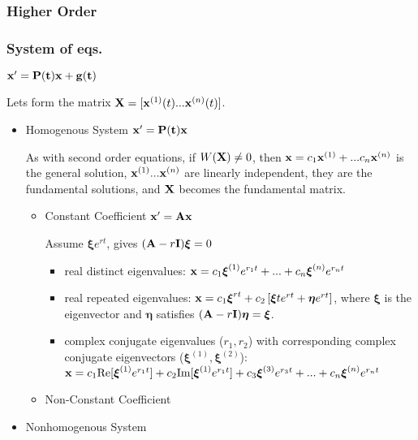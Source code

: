 \documentclass[11pt]{article}
\begin{document}
	\subsubsection{Higher Order}
	\subsubsection{System of eqs.}
	
	$\bold{x'}=\bold{P(t)}\bold{x}+\bold{g(t)}$
		
	Lets form the matrix $\bold{X}=[\bold{x}^{(1)}(t)...\bold{x}^{(n)}(t)]$.
		
		\begin{itemize}
		\item Homogenous System $\bold{x'}=\bold{P(t)x}$
	
		As with second order equations, if $W(\bold{X})\neq 0$, then $\bold{x}=c_1\bold{x}^{(1)}+...c_n\bold{x}^{(n)}$ is the general solution, $\bold{x}^{(1)}...\bold{x}^{(n)}$ are linearly independent, they are the fundamental solutions, and $\bold{X}$ becomes the fundamental matrix.
			\begin{itemize}
			\item Constant Coefficient $\bold{x'}=\bold{Ax}$
			
			Assume $ \boldsymbol{\xi} e^{rt} $, gives $(\bold{A}-r \bold{I}) \boldsymbol{\xi} = 0$
				\begin{itemize}
				\item real distinct eigenvalues: $\bold{x}=c_1 \boldsymbol{\xi}^{(1)}e^{r_1t}+...+c_n \boldsymbol{\xi}^{(n)} e^{r_nt}$
				\item real repeated eigenvalues: $\bold{x}=c_1\boldsymbol{\xi}^{rt}+c_2\left[ \boldsymbol{\xi} te^{rt}+ \boldsymbol{\eta} e^{rt}\right]$, where $\boldsymbol{\xi}$ is the eigenvector and $\boldsymbol{\eta}$ satisfies $(\bold{A}-r\bold{I}) \boldsymbol{\eta} = \boldsymbol{\xi}$.
				\item complex conjugate eigenvalues ($r_1, r_2$) with corresponding complex conjugate eigenvectors ($\boldsymbol{\xi}^{(1)}, \boldsymbol{\xi}^{(2)}$): \\
				 $\bold{x}=c_1\text{Re}[ \boldsymbol{\xi}^{(1)}e^{r_1t}]+c_2 \text{Im}[ \boldsymbol{\xi}^{(1)}e^{r_1t}]+c_3 \boldsymbol{\xi}^{(3)}e^{r_3t}+...+c_n \boldsymbol{\xi}^{(n)}e^{r_nt}$ 
				\end{itemize}
			\item Non-Constant Coefficient
			\end{itemize}
		\item Nonhomogenous System
		

\end{itemize}
\end{document}
